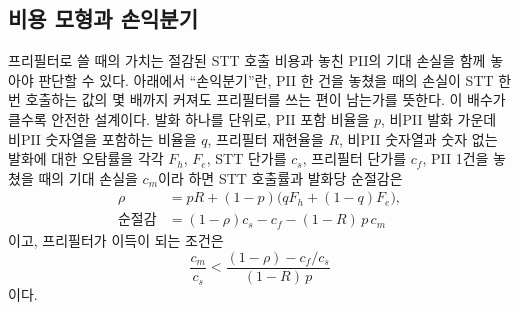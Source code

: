 \documentclass[10pt,twocolumn]{article}
\begin{document}
\subsection{비용 모형과 손익분기}\label{sec:discuss:cost}
프리필터로 쓸 때의 가치는 절감된 STT 호출 비용과 놓친 PII의 기대 손실을 함께 놓아야 판단할 수
있다. 아래에서 ``손익분기''란, PII 한 건을 놓쳤을 때의 손실이 STT 한 번 호출하는 값의 몇 배까지
커져도 프리필터를 쓰는 편이 남는가를 뜻한다. 이 배수가 클수록 안전한 설계이다. 발화 하나를 단위로, PII 포함
비율을 $p$, 비PII 발화 가운데 비PII 숫자열을 포함하는 비율을 $q$, 프리필터 재현율을 $R$, 비PII
숫자열과 숫자 없는 발화에 대한 오탐률을 각각 $F_h$, $F_e$, STT 단가를 $c_s$, 프리필터 단가를
$c_f$, PII 1건을 놓쳤을 때의 기대 손실을 $c_m$이라 하면 STT 호출률과 발화당 순절감은
\begin{align}
\rho &= pR + (1-p)\bigl(qF_h + (1-q)F_e\bigr), \\
\text{순절감} &= (1-\rho)c_s - c_f - (1-R)\,p\,c_m
\end{align}
이고, 프리필터가 이득이 되는 조건은
\begin{equation}
\frac{c_m}{c_s} < \frac{(1-\rho) - c_f/c_s}{(1-R)\,p}
\end{equation}
이다.
\end{document}
